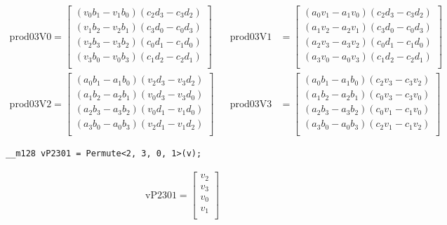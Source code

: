 \documentclass[]{scrartcl}
\newcommand{\pth}[1]{\left(#1\right)}
\begin{document}
\begin{align*}
\mathrm{prod03V0} 
=
\begin{bmatrix}
\pth{v_0b_1 - v_1b_0}\pth{c_2d_3 - c_3d_2}\\
\pth{v_1b_2 - v_2b_1}\pth{c_3d_0 - c_0d_3}\\
\pth{v_2b_3 - v_3b_2}\pth{c_0d_1 - c_1d_0}\\
\pth{v_3b_0 - v_0b_3}\pth{c_1d_2 - c_2d_1}\\
\end{bmatrix}
&&
\mathrm{prod03V1} 
&=
\begin{bmatrix}
\pth{a_0v_1 - a_1v_0}\pth{c_2d_3 - c_3d_2}\\
\pth{a_1v_2 - a_2v_1}\pth{c_3d_0 - c_0d_3}\\
\pth{a_2v_3 - a_3v_2}\pth{c_0d_1 - c_1d_0}\\
\pth{a_3v_0 - a_0v_3}\pth{c_1d_2 - c_2d_1}\\
\end{bmatrix}
\\
\mathrm{prod03V2} 
=
\begin{bmatrix}
\pth{a_0b_1 - a_1b_0}\pth{v_2d_3 - v_3d_2}\\
\pth{a_1b_2 - a_2b_1}\pth{v_0d_3 - v_3d_0}\\
\pth{a_2b_3 - a_3b_2}\pth{v_0d_1 - v_1d_0}\\
\pth{a_3b_0 - a_0b_3}\pth{v_2d_1 - v_1d_2}\\
\end{bmatrix}
&&
\mathrm{prod03V3} 
&=
\begin{bmatrix}
\pth{a_0b_1 - a_1b_0}\pth{c_2v_3 - c_3v_2}\\
\pth{a_1b_2 - a_2b_1}\pth{c_0v_3 - c_3v_0}\\
\pth{a_2b_3 - a_3b_2}\pth{c_0v_1 - c_1v_0}\\
\pth{a_3b_0 - a_0b_3}\pth{c_2v_1 - c_1v_2}\\
\end{bmatrix}
\end{align*}


\begin{verbatim}
__m128 vP2301 = Permute<2, 3, 0, 1>(v);
\end{verbatim}

\begin{align*}
\mathrm{vP2301} 
=
\begin{bmatrix}
v_2\\
v_3\\
v_0\\
v_1\\
\end{bmatrix}
\end{align*}
\end{document}
